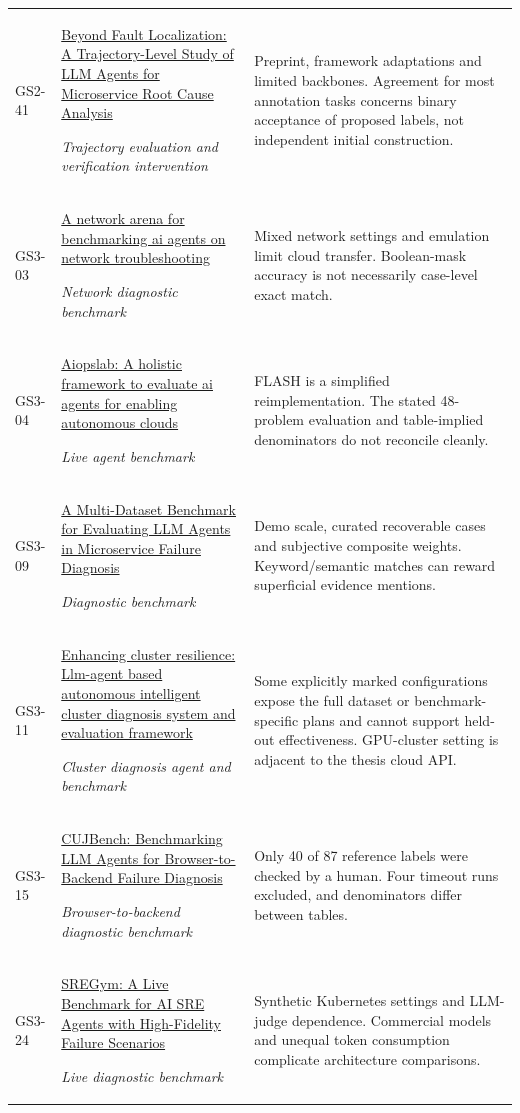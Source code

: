 \begin{longtable}{@{}p{}p{}p{}@{}}
GS2-41 & \href{https://arxiv.org/pdf/2608.21310}{Beyond Fault Localization: A Trajectory-Level Study of LLM Agents for Microservice Root Cause Analysis}\par\emph{Trajectory evaluation and verification intervention} & Preprint, framework adaptations and limited backbones. Agreement for most annotation tasks concerns binary acceptance of proposed labels, not independent initial construction. \\
GS3-03 & \href{https://arxiv.org/pdf/2512.16381}{A network arena for benchmarking ai agents on network troubleshooting}\par\emph{Network diagnostic benchmark} & Mixed network settings and emulation limit cloud transfer. Boolean-mask accuracy is not necessarily case-level exact match. \\
GS3-04 & \href{https://proceedings.mlsys.org/paper_files/paper/2025/file/d1f9e4a9f109b6e8b75ed362736f22ec-Paper-Conference.pdf}{Aiopslab: A holistic framework to evaluate ai agents for enabling autonomous clouds}\par\emph{Live agent benchmark} & FLASH is a simplified reimplementation. The stated 48-problem evaluation and table-implied denominators do not reconcile cleanly. \\
GS3-09 & \href{https://arxiv.org/pdf/2606.29193}{A Multi-Dataset Benchmark for Evaluating LLM Agents in Microservice Failure Diagnosis}\par\emph{Diagnostic benchmark} & Demo scale, curated recoverable cases and subjective composite weights. Keyword/semantic matches can reward superficial evidence mentions. \\
GS3-11 & \href{https://arxiv.org/pdf/2411.05349}{Enhancing cluster resilience: Llm-agent based autonomous intelligent cluster diagnosis system and evaluation framework}\par\emph{Cluster diagnosis agent and benchmark} & Some explicitly marked configurations expose the full dataset or benchmark-specific plans and cannot support held-out effectiveness. GPU-cluster setting is adjacent to the thesis cloud API. \\
GS3-15 & \href{https://arxiv.org/pdf/2604.23455}{CUJBench: Benchmarking LLM Agents for Browser-to-Backend Failure Diagnosis}\par\emph{Browser-to-backend diagnostic benchmark} & Only 40 of 87 reference labels were checked by a human. Four timeout runs excluded, and denominators differ between tables. \\
GS3-24 & \href{https://arxiv.org/pdf/2605.07161}{SREGym: A Live Benchmark for AI SRE Agents with High-Fidelity Failure Scenarios}\par\emph{Live diagnostic benchmark} & Synthetic Kubernetes settings and LLM-judge dependence. Commercial models and unequal token consumption complicate architecture comparisons. \\

\end{longtable}
